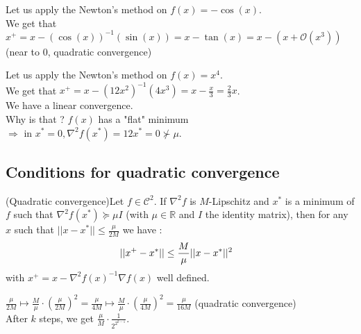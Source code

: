 \begin{example}
\begin{leftbar} 
Let us apply the Newton's method on $f(x) = -\cos(x)$. \\
We get that $x^+ = x - (\cos(x))^{-1}(\sin(x)) = x - \tan(x) = x - (x + \mathcal{O}(x^3))$ (near to 0, quadratic convergence) 
\end{leftbar}
\end{example}

\begin{example}
\begin{leftbar} 
Let us apply the Newton's method on $f(x) = x^4$. \\
We get that $x^+ = x - (12x^2)^{-1}(4x^3) = x - \frac{x}{3} = \frac{2}{3}x$. \\
We have a linear convergence.  \\
Why is that ? $f(x)$ has a "flat" minimum $\Longrightarrow \mbox{ in } x^* = 0, \nabla^2f(x^*) = 12x^* = 0 \nsucc \mu$.
\end{leftbar}
\end{example}

\subsection{Conditions for quadratic convergence}
\begin{theorem}{(Quadratic convergence)}Let $f \in \mathcal{C}^2$. If $\nabla^2f$ is $M$-Lipschitz and $x^*$ is a minimum of $f$ such that $\nabla^2f(x^*) \succeq \mu I$ (with $\mu \in \mathbb{R}$ and $I$ the identity matrix), then for any $x$ such that $||x-x^*|| \leq \frac{\mu}{2M}$ we have :
$$ ||x^+-x^*|| \leq \frac{M}{\mu} ||x-x^*||^2 \hspace{0.3cm}$$
with $x^+ = x - \nabla^2 f(x)^{-1} \nabla f(x)$ well defined.
\end{theorem}

\begin{example}
\begin{leftbar}
$\frac{\mu}{2M} \longmapsto \frac{M}{\mu} \cdot \left(\frac{\mu}{2M}\right)^2 = \frac{\mu}{4M} \longmapsto \frac{M}{\mu} \cdot \left(\frac{\mu}{4M}\right)^2 = \frac{\mu}{16M}$ (quadratic convergence) \\
After $k$ steps, we get $\frac{\mu}{M} \cdot \frac{1}{2^{2^{k-1}}}$.
\end{leftbar}
\end{example}

